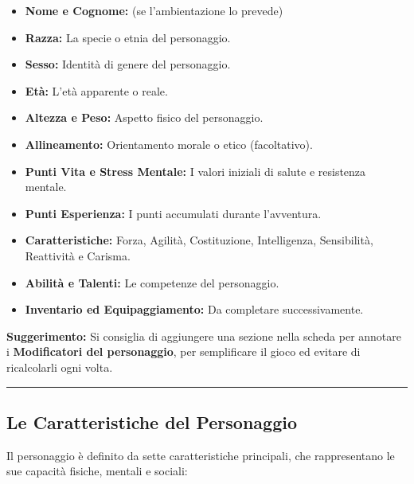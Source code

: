 \documentclass[../manuale_main.tex]{subfiles}
\begin{document}
\begin{itemize}
    \item \textbf{Nome e Cognome:} (se l'ambientazione lo prevede)
    \item \textbf{Razza:} La specie o etnia del personaggio.
    \item \textbf{Sesso:} Identità di genere del personaggio.
    \item \textbf{Età:} L’età apparente o reale.
    \item \textbf{Altezza e Peso:} Aspetto fisico del personaggio.
    \item \textbf{Allineamento:} Orientamento morale o etico (facoltativo).
    \item \textbf{Punti Vita e Stress Mentale:} I valori iniziali di salute e resistenza mentale.
    \item \textbf{Punti Esperienza:} I punti accumulati durante l'avventura.
    \item \textbf{Caratteristiche:} Forza, Agilità, Costituzione, Intelligenza, Sensibilità, Reattività e Carisma.
    \item \textbf{Abilità e Talenti:} Le competenze del personaggio.
    \item \textbf{Inventario ed Equipaggiamento:} Da completare successivamente.
\end{itemize}

\textbf{Suggerimento:} Si consiglia di aggiungere una sezione nella scheda per annotare i \textbf{Modificatori del personaggio}, per semplificare il gioco ed evitare di ricalcolarli ogni volta.

\vspace{0.5cm}
\rule{\textwidth}{0.4pt}
\vspace{0.5cm}

\subsection{Le Caratteristiche del Personaggio}
Il personaggio è definito da sette caratteristiche principali, che rappresentano le sue capacità fisiche, mentali e sociali:
\end{document}
